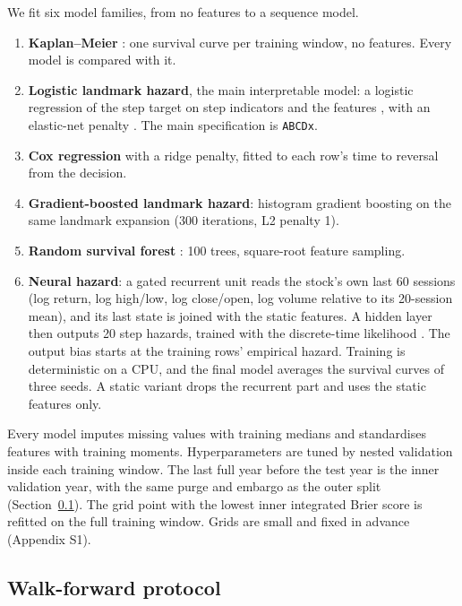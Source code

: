 We fit six model families, from no features to a sequence model.

\begin{enumerate}
\item \textbf{Kaplan--Meier} \citep{KaplanMeier1958}: one survival curve per training window, no
  features. Every model is compared with it.
\item \textbf{Logistic landmark hazard}, the main interpretable model: a logistic regression of
  the step target on step indicators and the features \citep{SingerWillett1993}, with an
  elastic-net penalty \citep{ZouHastie2005}. The main specification is \texttt{ABCDx}.
\item \textbf{Cox regression} \citep{Cox1972} with a ridge penalty, fitted to each row's time to
  reversal from the decision.
\item \textbf{Gradient-boosted landmark hazard}: histogram gradient boosting \citep{Friedman2001}
  on the same landmark expansion (300 iterations, L2 penalty 1).
\item \textbf{Random survival forest} \citep{Ishwaran2008}: 100 trees, square-root feature
  sampling.
\item \textbf{Neural hazard}: a gated recurrent unit \citep{Cho2014} reads the stock's own last 60
  sessions (log return, log high/low, log close/open, log volume relative to its 20-session mean),
  and its last state is joined with the static features. A hidden layer then outputs 20 step
  hazards, trained with the discrete-time likelihood \citep{KvammeBorgan2021}. The output bias
  starts at the training rows' empirical hazard. Training is deterministic on a CPU, and the final
  model averages the survival curves of three seeds. A static variant drops the recurrent part and
  uses the static features only.
\end{enumerate}

Every model imputes missing values with training medians and standardises features with training
moments. Hyperparameters are tuned by nested validation inside each training window. The last full
year before the test year is the inner validation year, with the same purge and embargo as the outer
split (Section~\ref{sec:walkforward}). The grid point with the lowest inner integrated Brier score is
refitted on the full training window. Grids are small and fixed in advance
(Appendix S1).

\subsection{Walk-forward protocol}\label{sec:walkforward}

